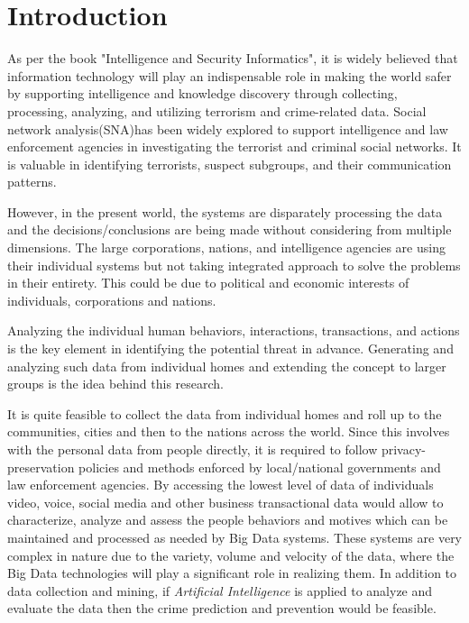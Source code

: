 \documentclass[sigconf]{acmart}
\begin{document}

\maketitle

\section{Introduction}
As per the book "Intelligence and Security Informatics"\cite{Kantor2005}, it is widely believed that information technology will play an indispensable role in making the world safer by supporting intelligence and knowledge discovery through collecting, processing, analyzing, and utilizing terrorism and crime-related data. Social network analysis(SNA)has been widely explored to support intelligence and law enforcement agencies in investigating the terrorist and criminal social networks. It is valuable in identifying terrorists, suspect subgroups, and their communication patterns.

However, in the present world, the systems are disparately processing the data and the decisions/conclusions are being made without considering from multiple dimensions. The large corporations, nations, and intelligence agencies are using their individual systems but not taking integrated approach to solve the problems in their entirety. This could be due to political and economic interests of individuals, corporations and nations.

Analyzing the individual human behaviors, interactions, transactions, and actions is the key element in identifying the potential threat in advance. Generating and analyzing such data from individual homes and extending the concept to larger groups is the idea behind this research.

It is quite feasible to collect the data from individual homes and roll up to the communities, cities and then to the nations across the world. Since this involves with the personal data from people directly, it is required to follow privacy-preservation policies and methods enforced by local/national governments and law enforcement agencies. By accessing the lowest level of data of individuals video, voice, social media and other business transactional data would allow to characterize, analyze and assess the people behaviors and motives which can be maintained and processed as needed by Big Data systems. These systems are very complex in nature due to the variety, volume and velocity of the data, where the Big Data technologies will play a significant role in realizing them. In addition to data collection and mining, if \textit{Artificial Intelligence} is applied to analyze and evaluate the data then the crime prediction and prevention would be feasible.
\end{document}
